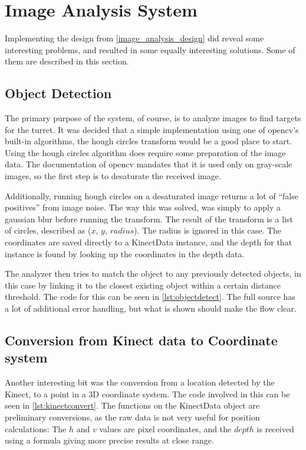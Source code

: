 \section{Image Analysis System}

Implementing the design from \autoref{image_analysis_design} did reveal some interesting problems, and resulted in
some equally interesting solutions. Some of them are described in this section.

\subsection{Object Detection}
The primary purpose of the system, of course, is to analyze images to find targets for the turret. It was decided
that a simple implementation using one of \ac{opencv}'s built-in algorithms, the hough circles transform would
be a good place to start. Using the hough circles algorithm does require some preparation of the image data.
The documentation of \ac{opencv} mandates that it is used only on gray-scale images, so the first step is to
desaturate the received image.

Additionally, running hough circles on a desaturated image returns a lot of ``false positives'' from image noise. The way
this was solved, was simply to apply a gaussian blur before running the transform. The result of the transform is a
list of circles, described as ($x$, $y$, $radius$). The radius is ignored in this case. The coordinates are saved directly
to a KinectData instance, and the depth for that instance is found by looking up the coordinates in the depth data.

The analyzer then tries to match the object to any previously detected objects, in this case by linking it to the closest
existing object within a certain distance threshold. The code for this can be seen in \autoref{lst:objectdetect}. The
full source has a lot of additional error handling, but what is shown should make the flow clear.



\subsection{Conversion from Kinect data to Coordinate system}
Another interesting bit
was the conversion from a location detected by the Kinect, to a point in a 3D coordinate system. The code involved
in this can be seen in \autoref{lst:kinectconvert}. The functions on the KinectData object are preliminary conversions,
as the raw data is not very useful for position calculations: The $h$ and $v$ values are pixel coordinates, and the $depth$
is received using a formula giving more precise results at close range.

